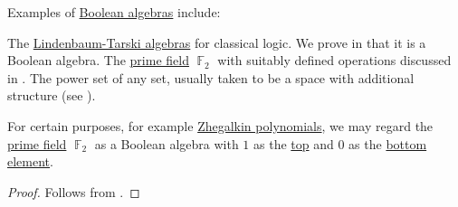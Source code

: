 \begin{example}\label{ex:boolean_algebras}
  Examples of \hyperref[def:boolean_algebra]{Boolean algebras} include:

  \begin{itemize}
     The \hyperref[def:lindenbaum_tarski_algebra]{Lindenbaum-Tarski algebras} for classical logic. We prove in  that it is a Boolean algebra.
     The \hyperref[thm:finite_fields]{prime field} \( \BbbF_2 \) with suitably defined operations discussed in .
     The power set of any set, usually taken to be a space with additional structure (see ).
  \end{itemize}
\end{example}

\begin{corollary}\label{thm:f2_is_boolean_algebra}
  For certain purposes, for example \hyperref[def:zhegalkin_polynomial]{Zhegalkin polynomials}, we may regard the \hyperref[thm:finite_fields]{prime field} \( \BbbF_2 \) as a Boolean algebra with \( 1 \) as the \hyperref[def:extremal_points/top_and_bottom]{top} and \( 0 \) as the \hyperref[def:extremal_points/top_and_bottom]{bottom element}.
\end{corollary}
\begin{proof}
  Follows from .
\end{proof}

